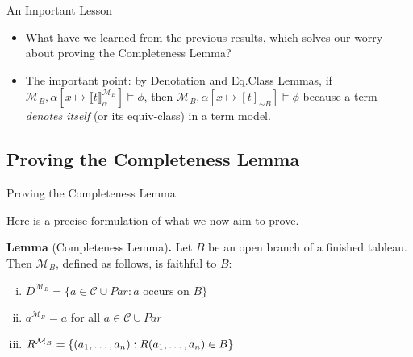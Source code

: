 \begin{frame}{An Important Lesson}

	\begin{itemize}%
	\itemsep=16pt
		
	\item What have we learned from the previous results, which solves our worry about proving the Completeness Lemma?
	
	\item The important point: by Denotation and Eq.Class Lemmas, if $\mathcal{M}_B,\alpha[x\mapsto \llbracket t \rrbracket^{\mathcal{M}_B}_\alpha]\vDash\phi$, then $\mathcal{M}_B,\alpha[x\mapsto[t]_{\sim B}]\vDash\phi$ because a term \emph{denotes itself} (or its equiv-class) in a term model.
	
	
	\end{itemize} 

\end{frame}

\subsection{Proving the Completeness Lemma}
\begin{frame}{Proving the Completeness Lemma}

Here is a precise formulation of what we now aim to prove.

\bigskip

\textbf{Lemma} (Completeness Lemma)\textbf{.} 
Let $B$ be an open branch of a finished tableau.
Then $\mathcal{M}_B$, defined as follows, is faithful to $B$:
\begin{enumerate}[(i)]
\item $D^{\mathcal{M}_B}=\{a\in \mathcal{C}\cup Par: a\text{ occurs on }B\}$
\item $a^{\mathcal{M}_B}=a$ for all $a\in \mathcal{C}\cup Par$
\item $R^{\mathcal{M}_B}=\{(a_1, \mathellipsis, a_n): R(a_1, \mathellipsis, a_n)\in B\}$
\end{enumerate}

\end{frame}

